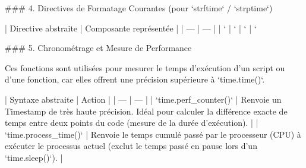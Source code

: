 ### 4. Directives de Formatage Courantes (pour `strftime` / `strptime`)

| Directive abstraite | Composante représentée |
| --- | --- |
| `%
| `%
| `%
| `%

### 5. Chronométrage et Mesure de Performance

Ces fonctions sont utilisées pour mesurer le temps d'exécution d'un script ou d'une fonction, car elles offrent une précision supérieure à `time.time()`.

| Syntaxe abstraite | Action |
| --- | --- |
| `time.perf_counter()` | Renvoie un Timestamp de très haute précision. Idéal pour calculer la différence exacte de temps entre deux points du code (mesure de la durée d'exécution). |
| `time.process_time()` | Renvoie le temps cumulé passé par le processeur (CPU) à exécuter le processus actuel (exclut le temps passé en pause lors d'un `time.sleep()`). |